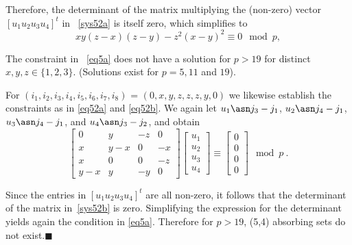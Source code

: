 Therefore, the determinant of the matrix multiplying the
(non-zero) vector $\left[u_1 u_2 u_3 u_4\right]^{t}$ in
~\eqref{sys52a} is itself zero, which simplifies to
\begin{equation}\label{eq5a}
xy(z-x)(z-y)-z^2(x-y)^2 \equiv 0 \mod p,
\end{equation}

The constraint in ~\eqref{eq5a} does not have a solution for
$p>19$ for distinct $x,y,z \in \{1,2,3\}$. (Solutions exist for
$p=5,11$ and $19$).

For $(i_1,i_2,i_3,i_4,i_5,i_6,i_7,i_8)$ = $(0,x,y,z,z,z,y,0)$ we
likewise establish the constraints as in \eqref{eq52a} and
\eqref{eq52b}. We again let $u_1 \asn j_3 -j_1$, $u_2\asn j_4
-j_1$, $u_3 \asn j_4 -j_1$, and $u_4 \asn j_3 -j_2$, and obtain
\begin{equation}\label{sys52b}
\left[ \begin{array}{ccccccc} 0 & y & -z & 0\\
x & y-x & 0 & -x\\
x & 0 &0 & -z\\
y-x & y & -y & 0
\end{array}\right] \left[\begin{array}{c}
u_1\\u_2\\u_3\\u_4 \end{array}\right] \equiv
\left[\begin{array}{c}0\\0\\0\\0\end{array}\right] \mod p~.
\end{equation}

Since the entries in  $\left[u_1 u_2 u_3 u_4\right]^{t}$ are all
non-zero, it follows that the determinant of the matrix
in~\eqref{sys52b} is zero. Simplifying the expression for the
determinant yields again the condition in \eqref{eq5a}. Therefore
for $p>19$, (5,4) absorbing sets do not exist.\hfill$\blacksquare$


